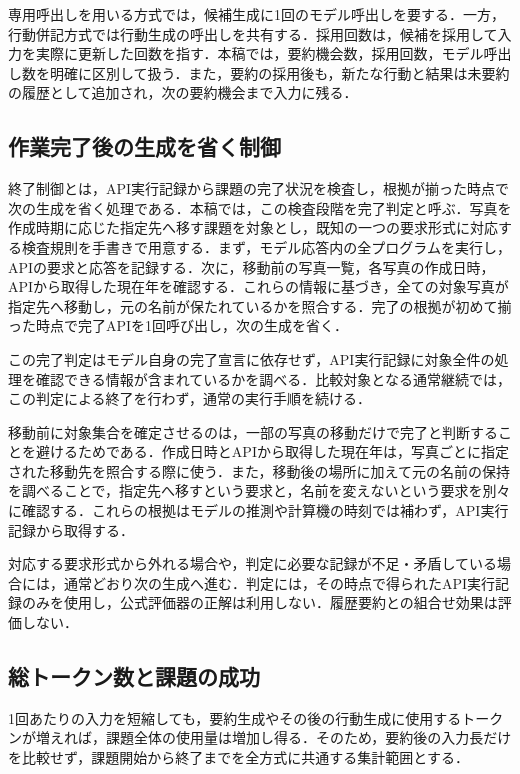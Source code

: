 \documentclass[letter]{ieicej}
\begin{document}
専用呼出しを用いる方式では，候補生成に1回のモデル呼出しを要する．一方，行動併記方式では行動生成の呼出しを共有する．採用回数は，候補を採用して入力を実際に更新した回数を指す．本稿では，要約機会数，採用回数，モデル呼出し数を明確に区別して扱う．また，要約の採用後も，新たな行動と結果は未要約の履歴として追加され，次の要約機会まで入力に残る．

\subsection{作業完了後の生成を省く制御}

終了制御とは，API実行記録から課題の完了状況を検査し，根拠が揃った時点で次の生成を省く処理である．本稿では，この検査段階を完了判定と呼ぶ．写真を作成時期に応じた指定先へ移す課題を対象とし，既知の一つの要求形式に対応する検査規則を手書きで用意する．まず，モデル応答内の全プログラムを実行し，APIの要求と応答を記録する．次に，移動前の写真一覧，各写真の作成日時，APIから取得した現在年を確認する．これらの情報に基づき，全ての対象写真が指定先へ移動し，元の名前が保たれているかを照合する．完了の根拠が初めて揃った時点で完了APIを1回呼び出し，次の生成を省く．

この完了判定はモデル自身の完了宣言に依存せず，API実行記録に対象全件の処理を確認できる情報が含まれているかを調べる．比較対象となる通常継続では，この判定による終了を行わず，通常の実行手順を続ける．

移動前に対象集合を確定させるのは，一部の写真の移動だけで完了と判断することを避けるためである．作成日時とAPIから取得した現在年は，写真ごとに指定された移動先を照合する際に使う．また，移動後の場所に加えて元の名前の保持を調べることで，指定先へ移すという要求と，名前を変えないという要求を別々に確認する．これらの根拠はモデルの推測や計算機の時刻では補わず，API実行記録から取得する．

対応する要求形式から外れる場合や，判定に必要な記録が不足・矛盾している場合には，通常どおり次の生成へ進む．判定には，その時点で得られたAPI実行記録のみを使用し，公式評価器の正解は利用しない．履歴要約との組合せ効果は評価しない．

\subsection{総トークン数と課題の成功}

1回あたりの入力を短縮しても，要約生成やその後の行動生成に使用するトークンが増えれば，課題全体の使用量は増加し得る．そのため，要約後の入力長だけを比較せず，課題開始から終了までを全方式に共通する集計範囲とする．
\end{document}
